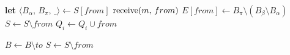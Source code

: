 {  \begin{multicols}{2}
    \EmptyComment*{}
    \EmptyComment*{}
    \columnbreak
   {
    \textbf{let} $\langle B_\alpha,\, B_\pi,\, \_ \rangle \leftarrow S[from]$ \;
    {$\textup{receive}(m,\,from)$ \label{line:todeliver}}  %
    $E[from] \leftarrow B_\pi \setminus (B_\beta\setminus B_\alpha)$ \label{line:toexpect} \;%
    $S \leftarrow S \setminus from$ \;
    $Q_i \leftarrow Q_i \cup from$ \; %
  }
  \end{multicols}
  \BlankLine
  
  \begin{multicols}{2}
   {
    $B \leftarrow B \setminus to$
  }
   {
    $S \leftarrow S \setminus from$
  }
  \end{multicols}
  \BlankLine
}


